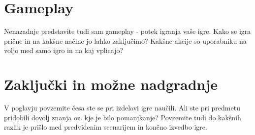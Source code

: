 \documentclass[a4paper]{article}
\begin{document}
\section{Gameplay}
Nenazadnje predstavite tudi sam gameplay - potek igranja vaše igre. Kako se igra prične in na kakšne načine jo lahko zaključimo? Kakšne akcije so uporabniku na voljo med samo igro in na kaj vplicajo?


\section{Zaključki in možne nadgradnje}
V poglavju povzemite česa ste se pri izdelavi igre naučili. Ali ste pri predmetu pridobili dovolj znanja oz. kje je bilo pomanjkanje? Povzemite tudi do kakšnih razlik je prišlo med predvidenim scenarijem in končno izvedbo igre.


\small


\end{document}
